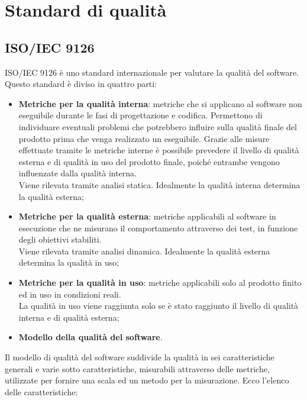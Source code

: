 \section{Standard di qualità}

	\subsection{ISO/IEC 9126}
	ISO/IEC 9126 è uno standard internazionale per valutare la qualità del software.\\%
	Questo standard è diviso in quattro parti:
	\begin{itemize}
		
		\item \textbf{Metriche per la qualità interna}: metriche che si applicano al software non eseguibile durante le fasi di progettazione e codifica. Permettono di individuare eventuali problemi che potrebbero influire sulla qualità finale del prodotto prima che venga realizzato un eseguibile. Grazie alle misure effettuate tramite le metriche interne è possibile prevedere il livello di qualità esterna e di qualità in uso del prodotto finale, poiché entrambe vengono influenzate dalla qualità interna.\\
		Viene rilevata tramite analisi statica. Idealmente la qualità interna determina la qualità esterna;
		\item \textbf{Metriche per la qualità esterna}: metriche applicabili al software in esecuzione che ne misurano il comportamento attraverso dei test, in funzione degli obiettivi stabiliti.\\
		Viene rilevata tramite analisi dinamica. Idealmente la qualità esterna determina la qualità in uso;
		\item \textbf{Metriche per la qualità in uso}: metriche applicabili solo al prodotto finito ed in uso in condizioni reali.\\
		La qualità in uso viene raggiunta solo se è stato raggiunto il livello di qualità interna e di qualità esterna;
		\item \textbf{Modello della qualità del software}.
	\end{itemize}
	Il modello di qualità del software suddivide la qualità in sei caratteristiche generali e varie sotto caratteristiche, misurabili attraverso delle metriche, utilizzate per fornire una scala ed un metodo per la misurazione. Ecco l'elenco delle caratteristiche:
